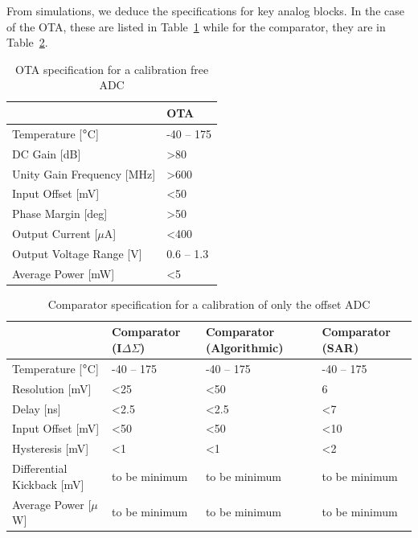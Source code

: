 

\clearpage
From simulations, we deduce the specifications for key analog blocks. In the case of the OTA, these are listed in Table~\ref{tbl:ota-spec-chapter4} while for the comparator, they are in Table~\ref{tbl:comp-spec-chapter4}.

\begin{table}[htp]
	\centering
	\caption{OTA specification for a calibration free ADC}
	\label{tbl:ota-spec-chapter4}
	\begin{tabular}{@{}ll@{}}
	\toprule
	 & OTA \\ \midrule
	 Temperature {[}$\degree$C{]} & -40 -- 175 \\
	DC Gain {[}dB{]} & \textgreater 80 \\
	Unity Gain Frequency {[}MHz{]} & \textgreater 600 \\
	Input Offset {[}mV{]} & \textless 50 \\
	Phase Margin [deg] & \textgreater 50 \\
	Output Current {[}$\mu$A{]} & \textless 400\\
	Output Voltage Range {[}V{]} & 0.6 -- 1.3 \\
	Average Power {[}mW{]} & \textless 5 \\ \bottomrule
	\end{tabular}
\end{table}

\begin{table}[htp]
	\centering
	\caption{Comparator specification for a calibration of only the offset ADC}
	\label{tbl:comp-spec-chapter4}
	\begin{tabular}{@{}llll@{}}
	\toprule
	 & Comparator (I$\Delta\Sigma$) & Comparator (Algorithmic) & Comparator (SAR) \\ \midrule
	Temperature {[}$\degree$C{]} & -40 -- 175 & -40 -- 175 & -40 -- 175 \\
	Resolution {[}mV{]} & \textless 25 & \textless 50 & 6 \\
	Delay {[}ns{]} & \textless 2.5 & \textless 2.5 & \textless 7 \\
	Input Offset {[}mV{]} & \textless 50 & \textless 50 & \textless 10 \\
	Hysteresis {[}mV{]} & \textless 1 & \textless 1 & \textless 2 \\
	Differential Kickback {[}mV{]} & to be minimum & to be minimum & to be minimum \\
	Average Power {[}$\mu$W{]} & to be minimum & to be minimum & to be minimum \\ \bottomrule
	\end{tabular}
\end{table}

